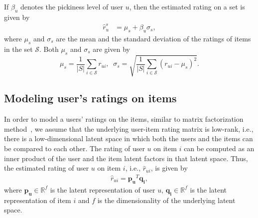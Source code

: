  
If $\beta_u$ denotes the pickiness level of user $u$,
then the estimated rating on a set is given by
\begin{equation} \label{varActEq}
  \begin{split}
    \hat{r}_{u}^s &= \mu_{s} + \beta_u \sigma_{s},
  \end{split}
\end{equation}
\noindent where $\mu_{s}$ and $\sigma_{s}$ are the mean and the standard
deviation of the ratings of items in the set $\mathcal{S}$.  %
Both $\mu_{s}$ and $\sigma_{s}$ are given by 
\begin{equation}
  \mu_{s} = \frac{1}{|S|} \sum_{i \in \mathcal{S}} r_{ui},\;\;  
  \sigma_{s} = \sqrt{\frac{1}{|S|} \sum_{i \in \mathcal{S}} (r_{ui} -\mu_{s})^2}.
\end{equation}

\iffalse
\noindent since we do not know the original ratings of the items in the sets, we
can estimate rating on the set as
\begin{equation} \label{varEstEq}
  \begin{split}
    \hat{r}_{u}^s &= \hat{\mu}_{s} + \beta_u \hat{\sigma}_{s} ,
  \end{split}
\end{equation}
\noindent where $\hat{\mu}_{s}$ is the mean and $\hat{\sigma}_{s}$ is the standard
deviation of the estimated ratings of items in the set $s$.
\fi


\subsection{Modeling user's ratings on items}
In order to model a users' ratings on the items, similar to matrix
factorization method~\cite{koren2009matrix},
we assume that the underlying user-item rating matrix is low-rank, i.e., there is a low-dimensional latent space in which both the users
and the items can be compared to each other. 
The rating of user $u$ on item $i$ can be computed as an inner product of
the user and the item latent factors in that latent space.
Thus, the estimated
rating of user $u$ on item $i$, i.e., $\hat{r}_{ui}$, is given by
\begin{equation} \label{ratPred_eq}
  \begin{split}
    \hat{r}_{ui} = \bm{p_u}^T\bm{q_i},
  \end{split}
\end{equation}
\noindent where $\bm{p_u} \in \mathbb{R}^f$  is the latent representation of user $u$,
$\bm{q_i} \in \mathbb{R}^f$ is the latent representation of item $i$ and $f$ is the
dimensionality of the underlying latent space.


